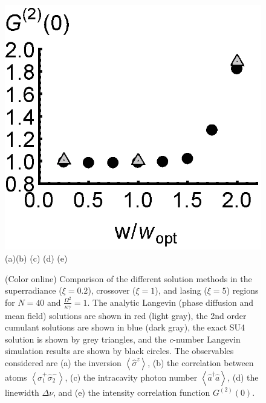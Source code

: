 \documentclass[aps,
twocolumn,
superscriptaddress,groupedaddress]{revtex4}
\begin{document}
\begin{figure}
\begin{center}
	\hspace{-5.0mm} \includegraphics[scale =0.38] {N40LaserG2.eps}\\ \vspace{1mm}
	\hspace{5mm}(a)\hspace{30mm}(b) \hspace{30mm}(c) \hspace{30mm}(d) \hspace{30mm}(e)
\end{center}
		\vspace{-5mm}
\caption{(Color online) Comparison of the different solution methods in
the superradiance ($\xi=0.2$), crossover ($\xi=1$), and lasing ($\xi=5$)
regions for $N=40$ and $\frac{\Omega^2}{\kappa \gamma}=1$.  The analytic Langevin (phase diffusion and mean field) solutions are shown
in red (light gray), the 2nd order cumulant solutions are shown in blue
(dark gray), the exact SU4 solution is shown by grey triangles, and the
{\it c}-number Langevin simulation results are shown by black circles. The
observables considered are (a) the inversion
$\left<\hat{\sigma}^{z}\right>$, (b) the correlation between atoms
$\left<\hat{\sigma}_{1}^{+} \hat{\sigma}_{2}^{-}\right>$, (c) the
intracavity photon number  $\left<\hat{a}^{\dagger}\hat{a}\right>$, (d)
the linewidth $\Delta \nu$, and (e) the intensity correlation function
$G^{(2)}(0)$.}
\label{N40Comparison}
\end{figure}
\end{document}
